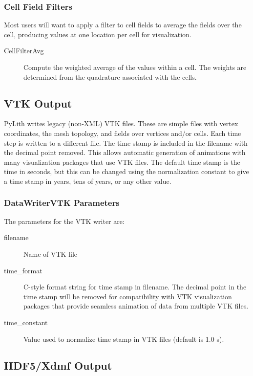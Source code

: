 \subsubsection{\label{sub:cell:field:filters}Cell Field Filters}

Most users will want to apply a filter to cell fields to average the
fields over the cell, producing values at one location per cell for
visualization.
\begin{description}
\item [{CellFilterAvg}] Compute the weighted average of the values within
a cell. The weights are determined from the quadrature associated
with the cells.
\end{description}

\subsection{VTK Output}

PyLith writes legacy (non-XML) VTK files. These are simple files with
vertex coordinates, the mesh topology, and fields over vertices and/or
cells. Each time step is written to a different file. The time stamp
is included in the filename with the decimal point removed. This allows
automatic generation of animations with many visualization packages
that use VTK files. The default time stamp is the time in seconds,
but this can be changed using the normalization constant to give a
time stamp in years, tens of years, or any other value.


\subsubsection{DataWriterVTK Parameters}

The parameters for the VTK writer are:
\begin{description}
\item [{filename}] Name of VTK file
\item [{time\_format}] C-style format string for time stamp in filename.
The decimal point in the time stamp will be removed for compatibility
with VTK visualization packages that provide seamless animation of
data from multiple VTK files.
\item [{time\_constant}] Value used to normalize time stamp in VTK files
(default is 1.0 s).
\end{description}

\subsection{\label{sub:HDF5/Xdmf-Output}HDF5/Xdmf Output}

